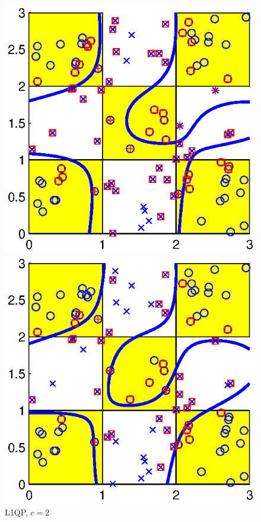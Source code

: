 \documentclass[11pt,a4paper]{article}
\theoremstyle{definition}
\begin{document}
      \begin{figure}[htbp]
        \centering
        \begin{minipage}[t]{0.24\linewidth}
          \centering
          \includegraphics[width=1\textwidth]{2_3x3_l1qp_2.eps}
          \caption{\label{Fig:ex3_1}L1QP, $c=2$}
        \end{minipage}
        \begin{minipage}[t]{0.24\linewidth}
          \centering
          \includegraphics[width=1\textwidth]{2_3x3_l1qp_10.eps}

\end{minipage}
\end{figure}
\end{document}
